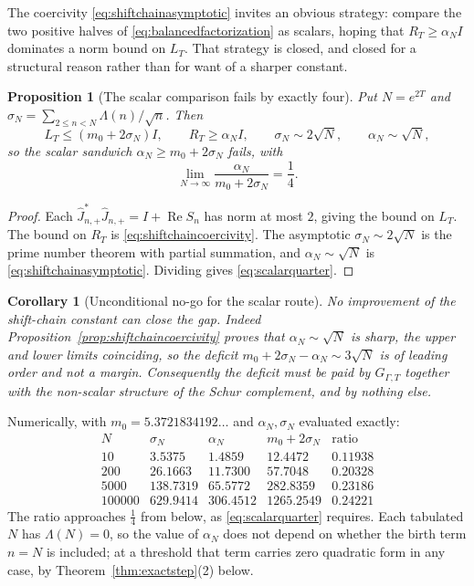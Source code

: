 \documentclass[11pt]{amsart}
\newtheorem{proposition}[theorem]{Proposition}
\newtheorem{corollary}[theorem]{Corollary}
\theoremstyle{definition}
\theoremstyle{remark}
\begin{document}
The coercivity \eqref{eq:shiftchainasymptotic} invites an obvious strategy:
compare the two positive halves of \eqref{eq:balancedfactorization} as
scalars, hoping that \(R_T\ge\alpha_NI\) dominates a norm bound on \(L_T\).
That strategy is closed, and closed for a structural reason rather than for
want of a sharper constant.

\begin{proposition}[The scalar comparison fails by exactly four]
\label{prop:scalarnogo}
Put \(N=e^{2T}\) and \(\sigma_N=\sum_{2\le n<N}\Lambda(n)/\sqrt n\).  Then
\[
 L_T\le(m_0+2\sigma_N)I,
 \qquad
 R_T\ge\alpha_NI,
 \qquad
 \sigma_N\sim2\sqrt N,
 \qquad
 \alpha_N\sim\sqrt N,
\]
so the scalar sandwich \(\alpha_N\ge m_0+2\sigma_N\) fails, with
\begin{equation}\label{eq:scalarquarter}
 \lim_{N\to\infty}\frac{\alpha_N}{m_0+2\sigma_N}=\frac14 .
\end{equation}
\end{proposition}

\begin{proof}
Each \(\widehat J_{n,+}^*\widehat J_{n,+}=I+\operatorname{Re}S_n\) has norm at
most \(2\), giving the bound on \(L_T\).  The bound on \(R_T\) is
\eqref{eq:shiftchaincoercivity}.  The asymptotic
\(\sigma_N\sim2\sqrt N\) is the prime number theorem with partial summation,
and \(\alpha_N\sim\sqrt N\) is \eqref{eq:shiftchainasymptotic}.  Dividing
gives \eqref{eq:scalarquarter}.
\end{proof}

\begin{corollary}[Unconditional no-go for the scalar route]
\label{cor:scalarnogo}
No improvement of the shift-chain constant can close the gap.  Indeed
Proposition~\ref{prop:shiftchaincoercivity} proves that
\(\alpha_N\sim\sqrt N\) is \emph{sharp}, the upper and lower limits
coinciding, so the deficit \(m_0+2\sigma_N-\alpha_N\sim3\sqrt N\) is of
leading order and not a margin.  Consequently the deficit must be paid by
\(G_{\Gamma,T}\) together with the non-scalar structure of the Schur
complement, and by nothing else.
\end{corollary}

Numerically, with \(m_0=5.3721834192\ldots\) and \(\alpha_N,\sigma_N\)
evaluated exactly:
\[
\begin{array}{c|c|c|c|c}
N&\sigma_N&\alpha_N&m_0+2\sigma_N&\text{ratio}\\ \hline
10     &3.5375  &1.4859  &12.4472   &0.11938\\
200    &26.1663 &11.7300 &57.7048   &0.20328\\
5000   &138.7319&65.5772 &282.8359  &0.23186\\
100000 &629.9414&306.4512&1265.2549 &0.24221
\end{array}
\]
The ratio approaches \(\tfrac14\) from below, as \eqref{eq:scalarquarter}
requires.  Each tabulated \(N\) has \(\Lambda(N)=0\), so the value of
\(\alpha_N\) does not depend on whether the birth term \(n=N\) is included;
at a threshold that term carries zero quadratic form in any case, by
Theorem~\ref{thm:exactstep}(2) below.
\end{document}
